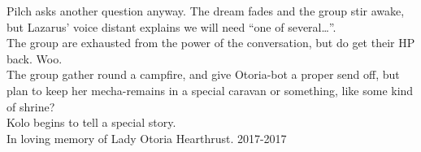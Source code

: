 Pilch asks another question anyway. The dream fades and the group stir awake, but Lazarus’ voice distant explains we will need “one of several…”.\\
The group are exhausted from the power of the conversation, but do get their HP back. Woo.\\
The group gather round a campfire, and give Otoria-bot a proper send off, but plan to keep her mecha-remains in a special caravan or something, like some kind of shrine?\\
Kolo begins to tell a special story.\\
In loving memory of Lady Otoria Hearthrust. 2017-2017\\